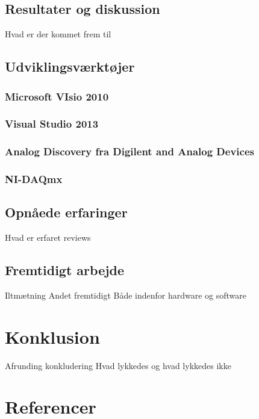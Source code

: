 \section{Resultater og diskussion}
Hvad er der kommet frem til
\section{Udviklingsværktøjer}
\subsection{Microsoft VIsio 2010}
\subsection{Visual Studio 2013}
\subsection{Analog Discovery fra Digilent and Analog Devices}
\subsection{NI-DAQmx}

\section{Opnåede erfaringer}
Hvad er erfaret
reviews
\section{Fremtidigt arbejde}
Iltmætning
Andet fremtidigt
Både indenfor hardware og software
\chapter{Konklusion}
Afrunding
konkludering
Hvad lykkedes og hvad lykkedes ikke
\chapter{Referencer}